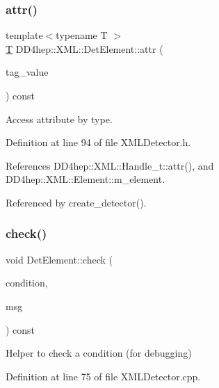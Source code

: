 \subsubsection{\texorpdfstring{attr()}{attr()}}
{\footnotesize\ttfamily template$<$typename T $>$ \\
\hyperlink{class_t}{T} D\+D4hep\+::\+X\+M\+L\+::\+Det\+Element\+::attr (\begin{DoxyParamCaption}\item[{const \hyperlink{namespace_d_d4hep_1_1_x_m_l_a09e5d9cc86ed782f6826dfe0778c1815}{Xml\+Char} $\ast$}]{tag\+\_\+value }\end{DoxyParamCaption}) const\hspace{0.3cm}{\ttfamily [inline]}}



Access attribute by type. 



Definition at line 94 of file X\+M\+L\+Detector.\+h.



References D\+D4hep\+::\+X\+M\+L\+::\+Handle\+\_\+t\+::attr(), and D\+D4hep\+::\+X\+M\+L\+::\+Element\+::m\+\_\+element.



Referenced by create\+\_\+detector().

\hypertarget{struct_d_d4hep_1_1_x_m_l_1_1_det_element_aee32c6df93ab1cb7d6dc36e7ae855112}{}\label{struct_d_d4hep_1_1_x_m_l_1_1_det_element_aee32c6df93ab1cb7d6dc36e7ae855112} 
\subsubsection{\texorpdfstring{check()}{check()}}
{\footnotesize\ttfamily void Det\+Element\+::check (\begin{DoxyParamCaption}\item[{bool}]{condition,  }\item[{const std\+::string \&}]{msg }\end{DoxyParamCaption}) const}



Helper to check a condition (for debugging) 



Definition at line 75 of file X\+M\+L\+Detector.\+cpp.

\hypertarget{struct_d_d4hep_1_1_x_m_l_1_1_det_element_a2014a14200d95427d7e42ce436f8ed29}{}\label{struct_d_d4hep_1_1_x_m_l_1_1_det_element_a2014a14200d95427d7e42ce436f8ed29} 
